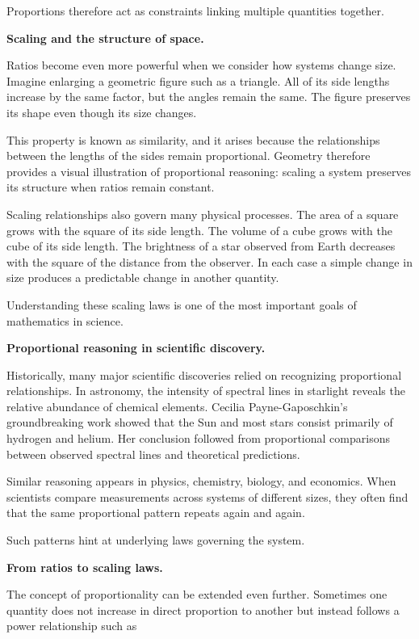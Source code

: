 \documentclass[11pt, openany]{book}
\theoremstyle{plain}
\theoremstyle{definition}
\theoremstyle{remark}
\begin{document}
Proportions therefore act as constraints linking multiple quantities
together.

\medskip

\textbf{Scaling and the structure of space.}

Ratios become even more powerful when we consider how systems change
size. Imagine enlarging a geometric figure such as a triangle. All of
its side lengths increase by the same factor, but the angles remain the
same. The figure preserves its shape even though its size changes.

This property is known as similarity, and it arises because the
relationships between the lengths of the sides remain proportional.
Geometry therefore provides a visual illustration of proportional
reasoning: scaling a system preserves its structure when ratios remain
constant.

Scaling relationships also govern many physical processes. The area of a
square grows with the square of its side length. The volume of a cube
grows with the cube of its side length. The brightness of a star
observed from Earth decreases with the square of the distance from the
observer. In each case a simple change in size produces a predictable
change in another quantity.

Understanding these scaling laws is one of the most important goals of
mathematics in science.

\medskip

\textbf{Proportional reasoning in scientific discovery.}

Historically, many major scientific discoveries relied on recognizing
proportional relationships. In astronomy, the intensity of spectral
lines in starlight reveals the relative abundance of chemical elements.
Cecilia Payne-Gaposchkin's groundbreaking work showed that the Sun and
most stars consist primarily of hydrogen and helium. Her conclusion
followed from proportional comparisons between observed spectral lines
and theoretical predictions.

Similar reasoning appears in physics, chemistry, biology, and economics.
When scientists compare measurements across systems of different sizes,
they often find that the same proportional pattern repeats again and
again.

Such patterns hint at underlying laws governing the system.

\medskip

\textbf{From ratios to scaling laws.}

The concept of proportionality can be extended even further. Sometimes
one quantity does not increase in direct proportion to another but
instead follows a power relationship such as
\end{document}
